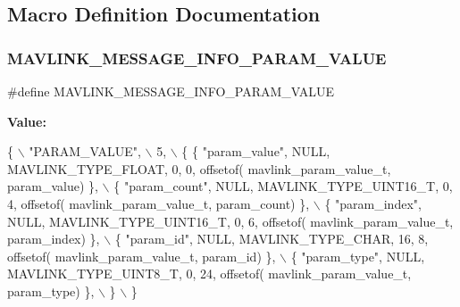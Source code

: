 \subsection{Macro Definition Documentation}
\mbox{\label{mavlink__msg__param__value_8h_af2eba04f3ff3d9893594622d63402b0e}} 
\subsubsection{M\+A\+V\+L\+I\+N\+K\+\_\+\+M\+E\+S\+S\+A\+G\+E\+\_\+\+I\+N\+F\+O\+\_\+\+P\+A\+R\+A\+M\+\_\+\+V\+A\+L\+UE}
{\footnotesize\ttfamily \#define M\+A\+V\+L\+I\+N\+K\+\_\+\+M\+E\+S\+S\+A\+G\+E\+\_\+\+I\+N\+F\+O\+\_\+\+P\+A\+R\+A\+M\+\_\+\+V\+A\+L\+UE}

{\bfseries Value\+:}
\begin{DoxyCode}
\{ \(\backslash\)
    \textcolor{stringliteral}{"PARAM\_VALUE"}, \(\backslash\)
    5, \(\backslash\)
    \{  \{ \textcolor{stringliteral}{"param\_value"}, NULL, MAVLINK_TYPE_FLOAT, 0, 0, offsetof(
      mavlink_param_value_t, param\_value) \}, \(\backslash\)
         \{ \textcolor{stringliteral}{"param\_count"}, NULL, MAVLINK_TYPE_UINT16_T, 0, 4, offsetof(
      mavlink_param_value_t, param_count) \}, \(\backslash\)
         \{ \textcolor{stringliteral}{"param\_index"}, NULL, MAVLINK_TYPE_UINT16_T, 0, 6, offsetof(
      mavlink_param_value_t, param_index) \}, \(\backslash\)
         \{ \textcolor{stringliteral}{"param\_id"}, NULL, MAVLINK_TYPE_CHAR, 16, 8, offsetof(
      mavlink_param_value_t, param\_id) \}, \(\backslash\)
         \{ \textcolor{stringliteral}{"param\_type"}, NULL, MAVLINK_TYPE_UINT8_T, 0, 24, offsetof(
      mavlink_param_value_t, param\_type) \}, \(\backslash\)
         \} \(\backslash\)
\}
\end{DoxyCode}
\mbox{\label{mavlink__msg__param__value_8h_a8342ef030d68cda57ef55a679a894504}} 
